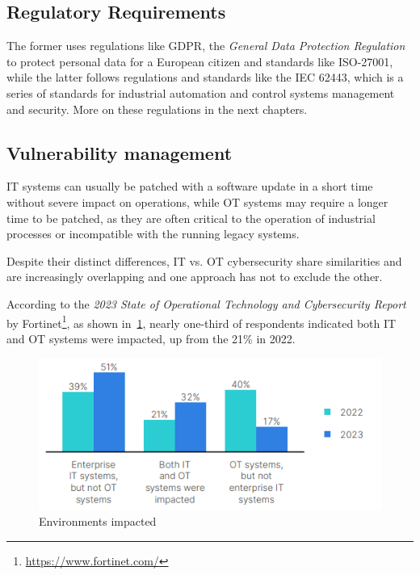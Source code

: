 \subsection{Regulatory Requirements}

The former uses regulations like GDPR, the \textit{General Data Protection Regulation} to protect personal data for a European citizen and standards like ISO-27001, while the latter follows regulations and standards like the IEC 62443, which is a series of standards for industrial automation and control systems management and security. More on these regulations in the next chapters.

\subsection{Vulnerability management}

IT systems can usually be patched with a software update in a short time without severe impact on operations, while OT systems may require a longer time to be patched, as they are often critical to the operation of industrial processes or incompatible with the running legacy systems.

Despite their distinct differences, IT vs. OT cybersecurity share similarities and are increasingly overlapping and one approach has not to exclude the other.

According to the \textit{2023 State of Operational Technology and Cybersecurity Report} by Fortinet\footnote{\url{https://www.fortinet.com/}}, as shown in~\cref{fig:fortinet-intrusions-env-impacted}, nearly one-third of respondents indicated both IT and OT systems were impacted, up from the 21\% in 2022.

\begin{figure}[h]
  \centering
  \includegraphics[scale=0.8]{chapters/02/assets/fortinet-intrusions-env-impacted.png}
  \caption[Environments impacted]{Environments impacted}
  \label{fig:fortinet-intrusions-env-impacted}
\end{figure}


